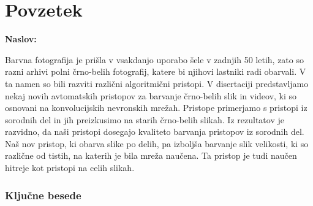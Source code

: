 \chapter*{Povzetek}

\noindent\textbf{Naslov:} \ttitle
\bigskip

Barvna fotografija je prišla v vsakdanjo uporabo šele v zadnjih 50 letih, zato so razni arhivi polni črno-belih fotografij, katere bi njihovi lastniki radi obarvali. V ta namen so bili razviti različni algoritmični pristopi.
V disertaciji predstavljamo nekaj novih avtomatskih pristopov za barvanje črno-belih slik in videov, ki so osnovani na konvolucijskih nevronskih mrežah. Pristope primerjamo s pristopi iz sorodnih del in jih preizkusimo na starih črno-belih slikah. 
Iz rezultatov je razvidno, da naši pristopi dosegajo kvaliteto barvanja pristopov iz sorodnih del. Naš nov pristop, ki obarva slike po delih, pa izboljša barvanje slik velikosti, ki so različne od tistih, na katerih je bila mreža naučena. Ta pristop je tudi naučen hitreje kot pristopi na celih slikah. 

\subsection*{Ključne besede}
\textit{\tkeywords}
\clearemptydoublepage